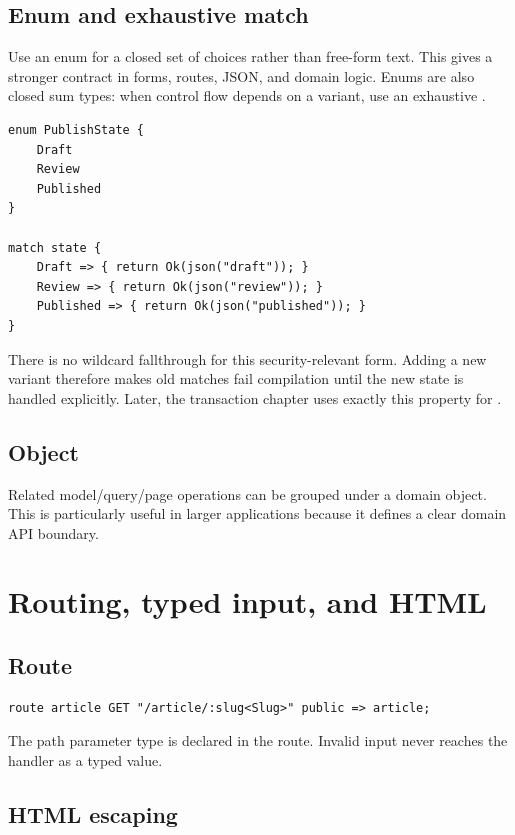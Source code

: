 \subsection*{Enum and exhaustive match}

Use an enum for a closed set of choices rather than free-form text. This gives a stronger contract in forms, routes, JSON, and domain logic. Enums are also closed sum types: when control flow depends on a variant, use an exhaustive .

\begin{lstlisting}[language=Velran]
enum PublishState {
    Draft
    Review
    Published
}

match state {
    Draft => { return Ok(json("draft")); }
    Review => { return Ok(json("review")); }
    Published => { return Ok(json("published")); }
}
\end{lstlisting}

There is no wildcard fallthrough for this security-relevant form. Adding a new variant therefore makes old matches fail compilation until the new state is handled explicitly. Later, the transaction chapter uses exactly this property for .

\subsection*{Object}

Related model/query/page operations can be grouped under a domain object. This is particularly useful in larger applications because it defines a clear domain API boundary.

\section{Routing, typed input, and HTML}

\subsection*{Route}

\begin{lstlisting}[language=Velran]
route article GET "/article/:slug<Slug>" public => article;
\end{lstlisting}

The path parameter type is declared in the route. Invalid input never reaches the handler as a typed value.

\subsection*{HTML escaping}

